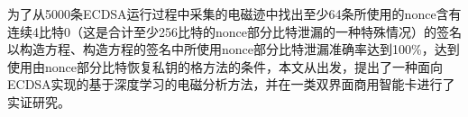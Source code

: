 {%
%	
	
	为了从5000条ECDSA运行过程中采集的电磁迹中找出至少64条所使用的nonce含有连续4比特0（这是合计至少256比特的nonce部分比特泄漏的一种特殊情况）的签名以构造方程、构造方程的签名中所使用nonce部分比特泄漏准确率达到100\%，达到使用由nonce部分比特恢复私钥的格方法的条件，本文从\jiaodu 出发，提出了一种面向ECDSA实现的基于深度学习的电磁分析方法，并在一类双界面商用智能卡进行了实证研究。
{	
	
}}
